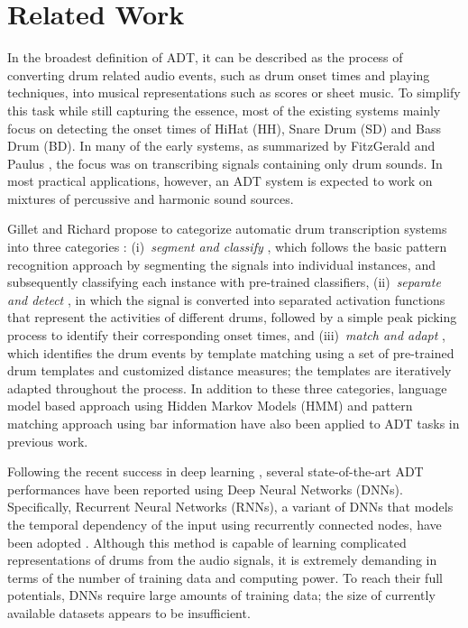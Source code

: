 \documentclass{article}
\begin{document}
\section{Related Work}\label{sec:related works}
In the broadest definition of ADT, it can be described as the process of converting drum related audio events, such as drum onset times and playing techniques, into musical representations such as scores or sheet music. To simplify this task while still capturing the essence, most of the existing systems mainly focus on detecting the onset times of HiHat (HH), Snare Drum (SD) and Bass Drum (BD). In many of the early systems, as summarized by FitzGerald and Paulus \cite{FitzGerald2006}, the focus was on transcribing signals containing only drum sounds. In most practical applications, however, an ADT system is expected to work on mixtures of percussive and harmonic sound sources. 

Gillet and Richard propose to categorize automatic drum transcription systems into three categories \cite{Gillet2008}: (i)~\textit{segment and classify} \cite{Gillet2008, Gajhede2016}, which follows the basic pattern recognition approach by segmenting the signals into individual instances, and subsequently classifying each instance with pre-trained classifiers, (ii)~\textit{separate and detect} \cite{Dittmar2014, Wu2015a, Roebel2015}, in which the signal is converted into separated activation functions that represent the activities of different drums, followed by a simple peak picking process to identify their corresponding onset times, and (iii)~\textit{match and adapt} \cite{Zils2002, Yoshii2007b}, which identifies the drum events by template matching using a set of pre-trained drum templates and customized distance measures; the templates are iteratively adapted throughout the process. In addition to these three categories, language model based approach using Hidden Markov Models (HMM) \cite{Paulus2009a} and pattern matching approach using bar information \cite{Thompson2014} have also been applied to ADT tasks in previous work. 

Following the recent success in deep learning \cite{Hinton2006}, several state-of-the-art ADT performances have been reported using Deep Neural Networks (DNNs). Specifically, Recurrent Neural Networks (RNNs), a variant of DNNs that models the temporal dependency of the input using recurrently connected nodes, have been adopted \cite{Vogl2016, Southall2016, Vogl2017}. Although this method is capable of learning complicated representations of drums from the audio signals, it is extremely demanding in terms of the number of training data and computing power. To reach their full potentials, DNNs require large amounts of training data; the size of currently available datasets appears to be insufficient.
\end{document}
